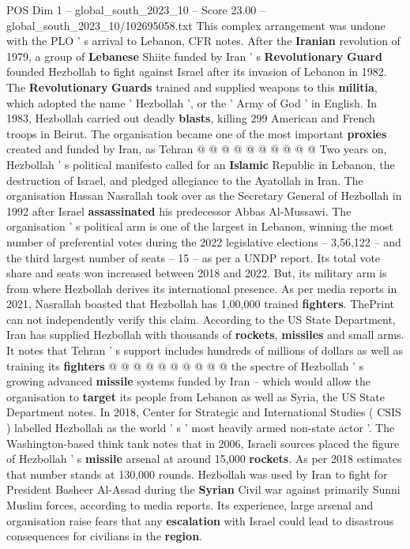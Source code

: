 \begin{textsample}{POS Dim 1 – global\_south\_2023\_10 – Score 23.00 – global\_south\_2023\_10/102695058.txt}
This complex arrangement was undone with the PLO ' s arrival to Lebanon, CFR notes.
After the \textbf{Iranian} revolution of 1979, a group of \textbf{Lebanese} Shiite funded by Iran ' s \textbf{Revolutionary} \textbf{Guard} founded Hezbollah to fight against Israel after its invasion of Lebanon in 1982.
The \textbf{Revolutionary} \textbf{Guards} trained and supplied weapons to this \textbf{militia}, which adopted the name ' Hezbollah ', or the ' Army of God ' in English.
In 1983, Hezbollah carried out deadly \textbf{blasts}, killing 299 American and French troops in Beirut.
The organisation became one of the most important \textbf{proxies} created and funded by Iran, as Tehran @ @ @ @ @ @ @ @ @ @ Two years on, Hezbollah ' s political manifesto called for an \textbf{Islamic} Republic in Lebanon, the destruction of Israel, and pledged allegiance to the Ayatollah in Iran.
The organisation Hassan Nasrallah took over as the Secretary General of Hezbollah in 1992 after Israel \textbf{assassinated} his predecessor Abbas Al-Mussawi.
The organisation ' s political arm is one of the largest in Lebanon, winning the most number of preferential votes during the 2022 legislative elections -- 3,56,122 -- and the third largest number of seats -- 15 -- as per a UNDP report.
Its total vote share and seats won increased between 2018 and 2022.
But, its military arm is from where Hezbollah derives its international presence.
As per media reports in 2021, Nasrallah boasted that Hezbollah has 1,00,000 trained \textbf{fighters}.
ThePrint can not independently verify this claim.
According to the US State Department, Iran has supplied Hezbollah with thousands of \textbf{rockets}, \textbf{missiles} and small arms.
It notes that Tehran ' s support includes hundreds of millions of dollars as well as training its \textbf{fighters} @ @ @ @ @ @ @ @ @ @ the spectre of Hezbollah ' s growing advanced \textbf{missile} systems funded by Iran -- which would allow the organisation to \textbf{target} its people from Lebanon as well as Syria, the US State Department notes.
In 2018, Center for Strategic and International Studies ( CSIS ) labelled Hezbollah as the world ' s ' most heavily armed non-state actor '.
The Washington-based think tank notes that in 2006, Israeli sources placed the figure of Hezbollah ' s \textbf{missile} arsenal at around 15,000 \textbf{rockets}.
As per 2018 estimates that number stands at 130,000 rounds.
Hezbollah was used by Iran to fight for President Basheer Al-Assad during the \textbf{Syrian} Civil war against primarily Sunni Muslim forces, according to media reports.
Its experience, large arsenal and organisation raise fears that any \textbf{escalation} with Israel could lead to disastrous consequences for civilians in the \textbf{region}.

\end{textsample}
